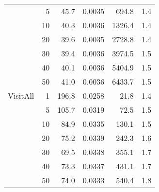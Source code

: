 \begin{table}[!h]
\begin{tabular}{lrrrrr}
         & 5 &        45.7 &      0.0035 &               694.8 &                           1.4 \\
         & 10 &        40.3 &      0.0036 &              1326.4 &                           1.4 \\
         & 20 &        39.6 &      0.0035 &              2728.8 &                           1.4 \\
         & 30 &        39.4 &      0.0036 &              3974.5 &                           1.5 \\
         & 40 &        40.1 &      0.0036 &              5404.9 &                           1.5 \\
         & 50 &        41.0 &      0.0036 &              6433.7 &                           1.5 \\ \midrule
VisitAll & 1 &       196.8 &      0.0258 &                21.8 &                           1.4 \\
         & 5 &       105.7 &      0.0319 &                72.5 &                           1.5 \\
         & 10 &        84.9 &      0.0335 &               130.1 &                           1.5 \\
         & 20 &        75.2 &      0.0339 &               242.3 &                           1.6 \\
         & 30 &        69.5 &      0.0338 &               355.1 &                           1.7 \\
         & 40 &        73.3 &      0.0337 &               431.1 &                           1.7 \\
         & 50 &        74.0 &      0.0333 &               540.4 &                           1.8 \\
\bottomrule
\end{tabular}
\end{table}